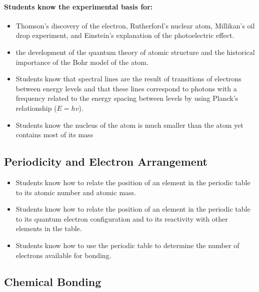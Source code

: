 \documentclass[12pt]{article}
\begin{document}
\paragraph{Students know the experimental basis for:}

\begin{itemize}
    \item Thomson's discovery of the electron, Rutherford's nuclear atom, Millikan's oil drop experiment, and Einstein's explanation of the photoelectric effect.
    \item the development of the quantum theory of atomic structure and the historical importance of the Bohr model of the atom.
    \item Students know that spectral lines are the result of transitions of electrons between energy levels and that these lines correspond to photons with a frequency related to the energy spacing between levels by using Planck's relationship ($E = hv$).
    \item Students know the nucleus of the atom is much smaller than the atom yet contains most of its mass
\end{itemize}


\subsection{Periodicity and Electron Arrangement}

\begin{itemize}
    \item Students know how to relate the position of an element in the periodic table to its atomic number and atomic mass.
    \item Students know how to relate the position of an element in the periodic table to its quantum electron configuration and to its reactivity with other elements in the table.
    \item Students know how to use the periodic table to determine the number of electrons available for bonding.
\end{itemize}

\subsection{Chemical Bonding}
\end{document}
